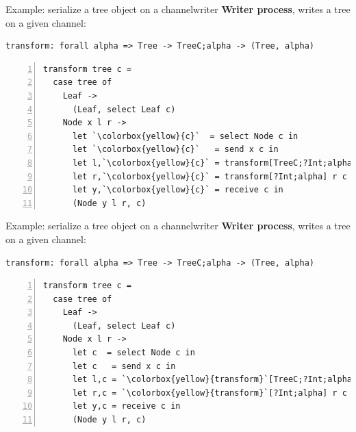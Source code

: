\documentclass[10pt]{beamer}
\begin{document}
\begin{frame}[fragile]{Example:  serialize a tree object on a channel\hfill{\color{mLightBrown}writer}}
	\textbf{Writer process}, writes a tree on a given channel:
	
\begin{lstlisting}
transform: forall alpha => Tree -> TreeC;alpha -> (Tree, alpha)
\end{lstlisting}

\begin{lstlisting}[numbers=left, xleftmargin=0.7cm, escapeinside=\`\`]
transform tree c =
  case tree of
    Leaf ->
      (Leaf, select Leaf c)
    Node x l r ->
      let `\colorbox{yellow}{c}`  = select Node c in
      let `\colorbox{yellow}{c}`   = send x c in 
      let l,`\colorbox{yellow}{c}` = transform[TreeC;?Int;alpha] l c in
      let r,`\colorbox{yellow}{c}` = transform[?Int;alpha] r c in
      let y,`\colorbox{yellow}{c}` = receive c in
      (Node y l r, c)
\end{lstlisting}

\end{frame}

\begin{frame}[fragile]{Example:  serialize a tree object on a channel\hfill{\color{mLightBrown}writer}}
	\textbf{Writer process}, writes a tree on a given channel:
	
\begin{lstlisting}
transform: forall alpha => Tree -> TreeC;alpha -> (Tree, alpha)
\end{lstlisting}

\begin{lstlisting}[numbers=left, xleftmargin=0.7cm, escapeinside=\`\`]
transform tree c =
  case tree of
    Leaf ->
      (Leaf, select Leaf c)
    Node x l r ->
      let c  = select Node c in
      let c   = send x c in 
      let l,c = `\colorbox{yellow}{transform}`[TreeC;?Int;alpha] l c in
      let r,c = `\colorbox{yellow}{transform}`[?Int;alpha] r c in
      let y,c = receive c in
      (Node y l r, c)
\end{lstlisting}

\end{frame}
\end{document}
